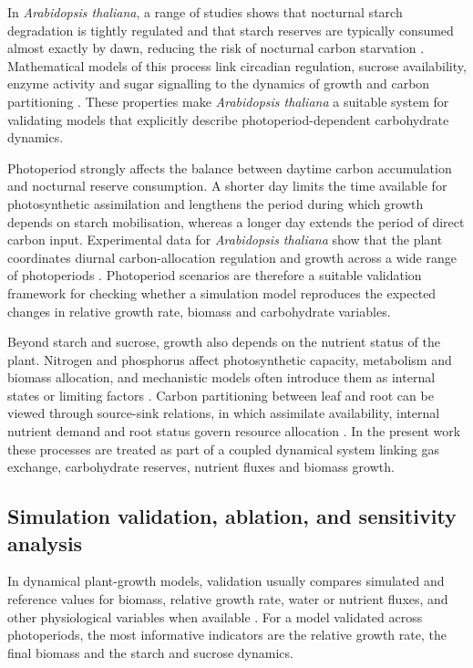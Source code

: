 \documentclass[a4paper,fleqn]{cas-sc}
\begin{document}
In \textit{Arabidopsis thaliana}, a range of studies shows that nocturnal starch degradation is tightly regulated and that starch reserves are typically consumed almost exactly by dawn, reducing the risk of nocturnal carbon starvation \cite{Scialdone2013,Stitt2012,Webb2015}. Mathematical models of this process link circadian regulation, sucrose availability, enzyme activity and sugar signalling to the dynamics of growth and carbon partitioning \cite{Feugier2013,Seki2017}. These properties make \textit{Arabidopsis thaliana} a suitable system for validating models that explicitly describe photoperiod-dependent carbohydrate dynamics.

Photoperiod strongly affects the balance between daytime carbon accumulation and nocturnal reserve consumption. A shorter day limits the time available for photosynthetic assimilation and lengthens the period during which growth depends on starch mobilisation, whereas a longer day extends the period of direct carbon input. Experimental data for \textit{Arabidopsis thaliana} show that the plant coordinates diurnal carbon-allocation regulation and growth across a wide range of photoperiods \cite{Sulpice2014}. Photoperiod scenarios are therefore a suitable validation framework for checking whether a simulation model reproduces the expected changes in relative growth rate, biomass and carbohydrate variables.

Beyond starch and sucrose, growth also depends on the nutrient status of the plant. Nitrogen and phosphorus affect photosynthetic capacity, metabolism and biomass allocation, and mechanistic models often introduce them as internal states or limiting factors \cite{Gastal2002,Xu2012,Barber1995,Shen2011,Carstensen2018}. Carbon partitioning between leaf and root can be viewed through source-sink relations, in which assimilate availability, internal nutrient demand and root status govern resource allocation \cite{Marcelis1996,Feller2015,Louarn2020}. In the present work these processes are treated as part of a coupled dynamical system linking gas exchange, carbohydrate reserves, nutrient fluxes and biomass growth.

\subsection{Simulation validation, ablation, and sensitivity analysis}

In dynamical plant-growth models, validation usually compares simulated and reference values for biomass, relative growth rate, water or nutrient fluxes, and other physiological variables when available \cite{Wallach2018,Holzworth2014,Jones2003,deWit2019}. For a model validated across photoperiods, the most informative indicators are the relative growth rate, the final biomass and the starch and sucrose dynamics.
\end{document}

